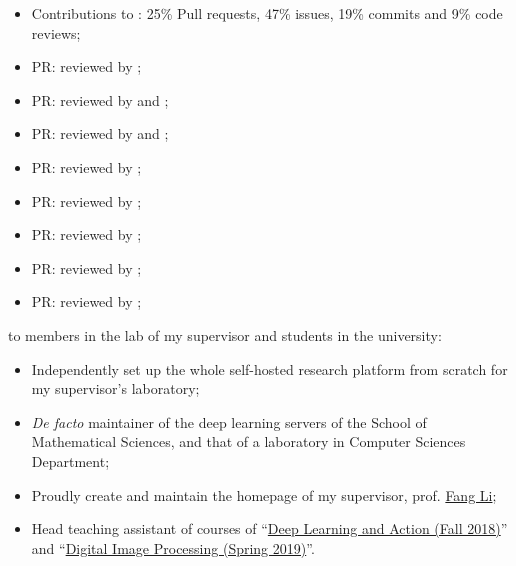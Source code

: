 \begin{itemize}
    \item Contributions to \textsf{\juliaimages}: 25\% Pull requests, 47\% issues, 19\% commits and 9\% code reviews;
    \item PR:  reviewed by \mbauman;
    \item PR:  reviewed by \evizero and \timholy;
    \item PR:  reviewed by \evizero and \timholy;
    \item PR:  reviewed by \julio;
    \item PR:  reviewed by \evizero;
    \item PR:  reviewed by \timholy;
    \item PR:  reviewed by \mikeinnes;
    \item PR:  reviewed by \mikeinnes;
\end{itemize}
to members in the lab of my supervisor and students in the university:
\begin{itemize}
    \item Independently set up the whole self-hosted research platform from scratch for my supervisor's laboratory;
    \item \textit{De facto} maintainer of the deep learning servers of the School of Mathematical Sciences, and that of a laboratory in Computer Sciences Department;
    \item Proudly create and maintain the homepage of my supervisor, prof. \href{http://math.ecnu.edu.cn/~fli/}{\textsf{Fang Li}};
    \item Head teaching assistant of courses of ``\href{http://math.ecnu.edu.cn/~fli/Teaching/DeepLearning/Fall2018/index.html}{Deep Learning and Action (Fall 2018)}''  and ``\href{http://math.ecnu.edu.cn/~fli/Teaching/DigitalImageProcessing/Spring2019/index.html}{Digital Image Processing (Spring 2019)}''.
\end{itemize}

